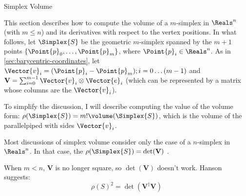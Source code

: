 
\begin{plSection}{Simplex Volume}
\label{sec:simplex_volume}

\nocite{Heckbert:1974:GraphicsGems4}
\nocite{GoodmanORourke:2004:HDCG2}

This section describes how to compute
the volume of a $m$-simplex in $\Reals^n$ (with $m \le n$)
and its derivatives with respect to the vertex positions.
In what follows, let $\Simplex{S}$ be the geometric $m$-simplex
spanned by the $m+1$ points $\{\Point{p}_0 , \ldots , \Point{p}_m\}$,
where $\Point{p}_i \in \Reals^n$.
As in \cref{sec:barycentric-coordinates},
let $\Vector{v}_i = (\Point{p}_i - \Point{p}_m); i = 0 \ldots (m-1)$
and ${\mathbf V} = \sum_{i=0}^{m-1} \Vector{v}_i \otimes \Vector{e}_i$
(which can be represented by a matrix whose columns are the $\Vector{v}_i$).

To simplify the discussion, I will describe computing the
value of the volume form: 
$\rho(\Simplex{S}) = m! \volume(\Simplex{S})$,
which is the volume of the parallelpiped with sides $\Vector{v}_i$.

Most discussions of simplex volume consider
only the case of a $n$-simplex in $\Reals^n$.
In that case, the $\rho(\Simplex{S}) = \det({\mathbf V)}$
\cite{HenkRichterGebertZiegler:2004:ConvexPolytopes}.

When $m < n$, ${\mathbf V}$ is no longer square,
so $\det({\mathbf V})$ doesn't work.
Hanson \cite{Hanson:1994:NdGraphics} suggests:
\begin{equation}
\rho(S)^2 = \det({\mathbf V}^{\dagger} {\mathbf V})
\end{equation}

\end{plSection}%
